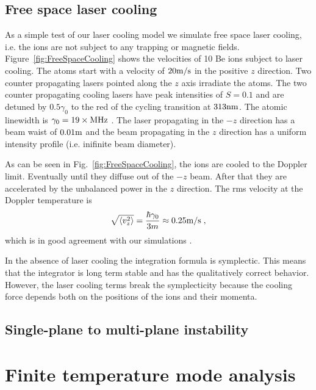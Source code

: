 \documentclass[aps, pra, twocolumn]{revtex4-1}
\begin{document}
\subsection{Free space laser cooling}

As a simple test of our laser cooling model we simulate free space laser
cooling, i.e. the ions are not subject to any trapping or magnetic
fields.  Figure~\ref{fig:FreeSpaceCooling} shows the velocities of 10 Be
ions subject to laser cooling.  The atoms start with a velocity of
$20{\rm m}/{\rm s}$ in the positive $z$ direction.  Two counter
propagating lasers pointed along the $z$ axis irradiate the atoms. The
two counter propagating cooling lasers have peak intensities of $S=0.1$
and are detuned by $0.5\gamma_0$ to the red of the cycling transition at
$313{\rm nm}$.  The atomic linewidth is $\gamma_0=19\times {\rm MHz}$ .
The laser propagating in the $-z$ direction has a beam waist of
$0.01{\rm m}$ and the beam propagating in the $z$ direction has a
uniform intensity profile (i.e. inifinite beam diameter).

As can be seen in Fig.~\ref{fig:FreeSpaceCooling}, the ions are cooled
to the Doppler limit.  Eventually until they diffuse out of the $-z$
beam.  After that they are accelerated by the unbalanced power in the
$z$ direction.  The rms velocity at the Doppler temperature is
\begin{equation}
\sqrt{\langle v_z^2\rangle} = \frac{\hbar \gamma_0}{3 m} \approx
0.25{\rm m}/{\rm s}\;,
\end{equation}
which is in good agreement with our simulations
.

In the absence of laser cooling the integration formula is
symplectic. This means that the integrator is long term stable
and has the qualitatively correct behavior. However, the laser
cooling terms break the symplecticity because the cooling force
depends both on the positions of the ions and their momenta.


\subsection{Single-plane to multi-plane instability}
\label{sec:validation}


\section{Finite temperature mode analysis}
\end{document}
